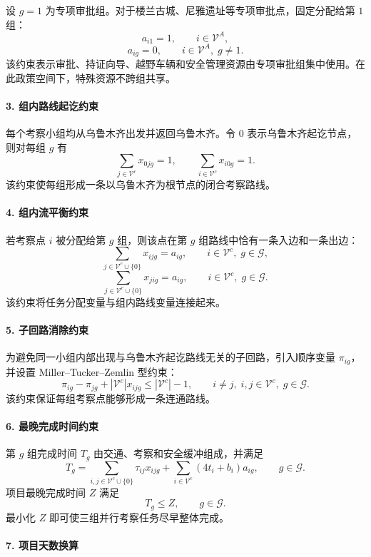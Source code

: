 \documentclass[UTF8,zihao=-4,a4paper]{ctexart}
\begin{document}
设 $g=1$ 为专项审批组。对于楼兰古城、尼雅遗址等专项审批点，固定分配给第 $1$ 组：
\[
a_{i1}=1,
\qquad i\in\mathcal{V}^{A},
\]
\[
a_{ig}=0,
\qquad i\in\mathcal{V}^{A},\;g\neq 1.
\]
该约束表示审批、持证向导、越野车辆和安全管理资源由专项审批组集中使用。在此政策空间下，特殊资源不跨组共享。

\paragraph{3. 组内路线起讫约束}

每个考察小组均从乌鲁木齐出发并返回乌鲁木齐。令 $0$ 表示乌鲁木齐起讫节点，则对每组 $g$ 有
\[
\sum_{j\in\mathcal{V}^{c}}x_{0jg}=1,
\qquad
\sum_{i\in\mathcal{V}^{c}}x_{i0g}=1.
\]
该约束使每组形成一条以乌鲁木齐为根节点的闭合考察路线。

\paragraph{4. 组内流平衡约束}

若考察点 $i$ 被分配给第 $g$ 组，则该点在第 $g$ 组路线中恰有一条入边和一条出边：
\[
\sum_{j\in\mathcal{V}^{c}\cup\{0\}}x_{ijg}=a_{ig},
\qquad i\in\mathcal{V}^{c},\;g\in\mathcal{G},
\]
\[
\sum_{j\in\mathcal{V}^{c}\cup\{0\}}x_{jig}=a_{ig},
\qquad i\in\mathcal{V}^{c},\;g\in\mathcal{G}.
\]
该约束将任务分配变量与组内路线变量连接起来。

\paragraph{5. 子回路消除约束}

为避免同一小组内部出现与乌鲁木齐起讫路线无关的子回路，引入顺序变量 $\pi_{ig}$，并设置 Miller--Tucker--Zemlin 型约束：
\[
\pi_{ig}-\pi_{jg}
+
|\mathcal{V}^{c}|x_{ijg}
\leq
|\mathcal{V}^{c}|-1,
\qquad i\neq j,\; i,j\in\mathcal{V}^{c},\; g\in\mathcal{G}.
\]
该约束保证每组考察点能够形成一条连通路线。

\paragraph{6. 最晚完成时间约束}

第 $g$ 组完成时间 $T_g$ 由交通、考察和安全缓冲组成，并满足
\[
T_g
=
\sum_{i,j\in\mathcal{V}^{c}\cup\{0\}}\tau_{ij}x_{ijg}
+
\sum_{i\in\mathcal{V}^{c}}(4t_i+b_i)a_{ig},
\qquad g\in\mathcal{G}.
\]
项目最晚完成时间 $Z$ 满足
\[
T_g\leq Z,\qquad g\in\mathcal{G}.
\]
最小化 $Z$ 即可使三组并行考察任务尽早整体完成。

\paragraph{7. 项目天数换算}
\end{document}
